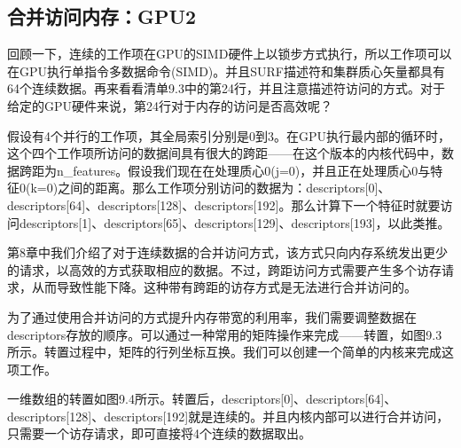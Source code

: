 \subsection{合并访问内存：GPU2}

回顾一下，连续的工作项在GPU的SIMD硬件上以锁步方式执行，所以工作项可以在GPU执行单指令多数据命令(SIMD)。并且SURF描述符和集群质心矢量都具有64个连续数据。再来看看清单9.3中的第24行，并且注意描述符访问的方式。对于给定的GPU硬件来说，第24行对于内存的访问是否高效呢？

假设有4个并行的工作项，其全局索引分别是0到3。在GPU执行最内部的循环时，这个四个工作项所访问的数据间具有很大的跨距——在这个版本的内核代码中，数据跨距为n\_\allowbreak{}features。假设我们现在在处理质心0(j=0)，并且正在处理质心0与特征0(k=0)之间的距离。那么工作项分别访问的数据为：descriptors[0]、descriptors[64]、descriptors[128]、descriptors[192]。那么计算下一个特征时就要访问descriptors[1]、descriptors[65]、descriptors[129]、descriptors[193]，以此类推。

第8章中我们介绍了对于连续数据的合并访问方式，该方式只向内存系统发出更少的请求，以高效的方式获取相应的数据。不过，跨距访问方式需要产生多个访存请求，从而导致性能下降。这种带有跨距的访存方式是无法进行合并访问的。

为了通过使用合并访问的方式提升内存带宽的利用率，我们需要调整数据在descriptors存放的顺序。可以通过一种常用的矩阵操作来完成——转置，如图9.3所示。转置过程中，矩阵的行列坐标互换。我们可以创建一个简单的内核来完成这项工作。



一维数组的转置如图9.4所示。转置后，descriptors[0]、descriptors[64]、descriptors[128]、descriptors[192]就是连续的。并且内核内部可以进行合并访问，只需要一个访存请求，即可直接将4个连续的数据取出。

